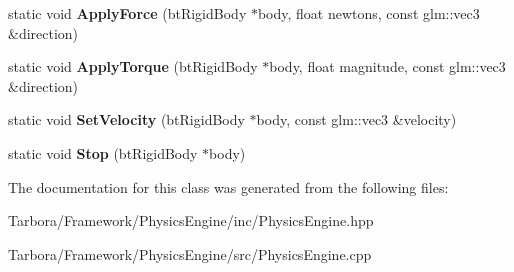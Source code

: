 \begin{DoxyCompactItemize}
static void {\bfseries Apply\+Force} (bt\+Rigid\+Body $\ast$body, float newtons, const glm\+::vec3 \&direction)
\item 
\mbox{\label{classTarbora_1_1PhysicsEngine_a7bfaabd962f0825536195708d4442a3d}} 
static void {\bfseries Apply\+Torque} (bt\+Rigid\+Body $\ast$body, float magnitude, const glm\+::vec3 \&direction)
\item 
\mbox{\label{classTarbora_1_1PhysicsEngine_a1c4650ee51cd6094b6faa141206a6403}} 
static void {\bfseries Set\+Velocity} (bt\+Rigid\+Body $\ast$body, const glm\+::vec3 \&velocity)
\item 
\mbox{\label{classTarbora_1_1PhysicsEngine_aca13d6e0e807662cd096fe899c5b8776}} 
static void {\bfseries Stop} (bt\+Rigid\+Body $\ast$body)
\end{DoxyCompactItemize}


The documentation for this class was generated from the following files\+:\begin{DoxyCompactItemize}
\item 
Tarbora/\+Framework/\+Physics\+Engine/inc/Physics\+Engine.\+hpp\item 
Tarbora/\+Framework/\+Physics\+Engine/src/Physics\+Engine.\+cpp\end{DoxyCompactItemize}
